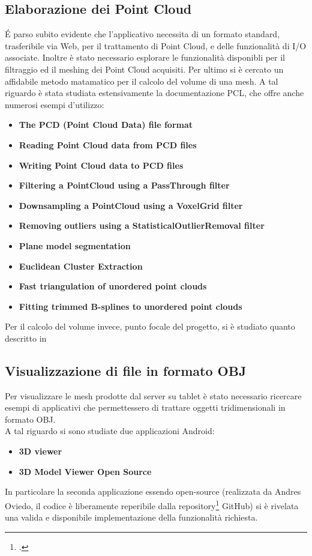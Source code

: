 \subsection{Elaborazione dei Point Cloud}
\'E parso subito evidente che l'applicativo necessita di un formato standard, trasferibile via Web, per il trattamento di Point Cloud, e delle funzionalità di I/O associate. Inoltre è stato necessario esplorare le funzionalità disponibli per il filtraggio ed il meshing dei Point Cloud acquisiti. Per ultimo si è cercato un affidabile metodo matamatico per il calcolo del volume di una mesh. A tal riguardo è stata studiata estensivamente la documentazione PCL, che offre anche numerosi esempi d'utilizzo:
\begin{itemize}
\item\textbf{The PCD (Point Cloud Data) file format} \cite{site:PCD}
\item\textbf{Reading Point Cloud data from PCD files} \cite{site:PCD-read}
\item\textbf{Writing Point Cloud data to PCD files} \cite{site:PCD-write}
\item\textbf{Filtering a PointCloud using a PassThrough filter} \cite{site:passthrough}
\item\textbf{Downsampling a PointCloud using a VoxelGrid filter} \cite{site:voxel}
\item\textbf{Removing outliers using a StatisticalOutlierRemoval filter} \cite{site:outliers}
\item\textbf{Plane model segmentation}\cite{site:segmentation}
\item\textbf{Euclidean Cluster Extraction}\cite{site:cluster}
\item \textbf{Fast triangulation of unordered point clouds}\cite{site:meshing}
\item \textbf{Fitting trimmed B-splines to unordered point clouds}\cite{site:bsplines}
\end{itemize}
\noindent
Per il calcolo del volume invece, punto focale del progetto, si è studiato quanto descritto in \cite{paper:volume}

\subsection{Visualizzazione di file in formato OBJ}
Per visualizzare le mesh prodotte dal server su tablet è stato necessario ricercare esempi di applicativi che permettessero di trattare oggetti tridimensionali in formato OBJ.\\
A tal riguardo si sono studiate due applicazioni Android:
\begin{itemize}
\item\textbf{3D viewer}\cite{site:3d-viewer}
\item\textbf{3D Model Viewer Open Source}\cite{site:3d-viewer-os}
\end{itemize}
\noindent
In particolare la seconda applicazione essendo open-source (realizzata da Andres Oviedo, il codice è liberamente reperibile dalla repository\footcite{https://github.com/andresoviedo/android-3D-model-viewer} GitHub) si è rivelata una valida e disponibile implementazione della funzionalità richiesta.

